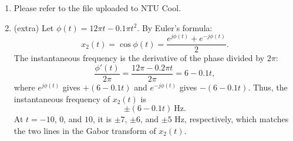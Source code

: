 \documentclass[12pt,a4paper]{article}
\begin{document}
\begin{enumerate}
\begin{enumerate}[label=(\alph*)]
    \item For $x(t)=1$, the exponent is
    \[
    -\sigma\pi(\tau-t)^2-j2\pi f\tau=-\big[\sigma\pi\tau^2+(-2\sigma\pi t+j2\pi f)\tau\big]-\sigma\pi t^2 .
    \]
    With $a=\sigma\pi$ and $b=-2\pi(\sigma t-jf)$, we have $\sqrt{\pi/a}=1/\sqrt{\sigma}$ and $\frac{b^2}{4a}=\sigma\pi t^2-j2\pi tf-\frac{\pi f^2}{\sigma}$. Therefore,
    \[
    G_x(t,f)=\sigma^{-1/4}\,e^{-\pi f^2/\sigma}\,e^{-j2\pi ft}.
    \]

    \item For $x(t)=e^{-\pi t^2}$, the exponent is
    \[
    -\sigma\pi(\tau-t)^2-\pi\tau^2-j2\pi f\tau=-\big[(\sigma+1)\pi\tau^2-2\pi(\sigma t-jf)\tau\big]-\sigma\pi t^2 .
    \]
    With $a=(\sigma+1)\pi$ and $b=-2\pi(\sigma t-jf)$, we have $\sqrt{\pi/a}=1/\sqrt{\sigma+1}$ and
    \[
    \frac{b^2}{4a}-\sigma\pi t^2=\frac{\pi(\sigma^2t^2-2j\sigma tf-f^2)-\sigma\pi t^2(\sigma+1)}{\sigma+1}=-\pi\frac{\sigma t^2+f^2+2j\sigma tf}{\sigma+1}.
    \]
    Therefore,
    \[
    G_x(t,f)=\frac{\sqrt[4]{\sigma}}{\sqrt{\sigma+1}}\exp\!\left(-\pi\frac{\sigma t^2+f^2}{\sigma+1}\right)\exp\!\left(-j\frac{2\pi\sigma tf}{\sigma+1}\right).
    \]
    When $\sigma=1$, $|G_x(t,f)|=\frac{1}{\sqrt{2}}e^{-\pi(t^2+f^2)/2}$, which is circular in the time-frequency plane.
\end{enumerate}

\item Please refer to the file uploaded to NTU Cool.

\item (extra) Let $\phi(t)=12\pi t-0.1\pi t^2$. By Euler's formula: 
  \[
  x_2(t)=\cos\phi(t)=\frac{e^{j\phi(t)}+e^{-j\phi(t)}}{2}.
  \]
  The instantaneous frequency is the derivative of the phase divided by $2\pi$:
  \[
  \frac{\phi'(t)}{2\pi}=\frac{12\pi-0.2\pi t}{2\pi}=6-0.1t ,
  \]
  where $e^{j\phi(t)}$ gives $+(6-0.1t)$ and $e^{-j\phi(t)}$ gives $-(6-0.1t)$. Thus, the instantaneous frequency of $x_2(t)$ is
  \[
  \pm(6-0.1t)\ \text{Hz}.
  \]
  At $t=-10$, $0$, and $10$, it is $\pm7$, $\pm6$, and $\pm5$ Hz, respectively, which matches the two lines in the Gabor transform of $x_2(t)$.

\end{enumerate}
\end{document}
